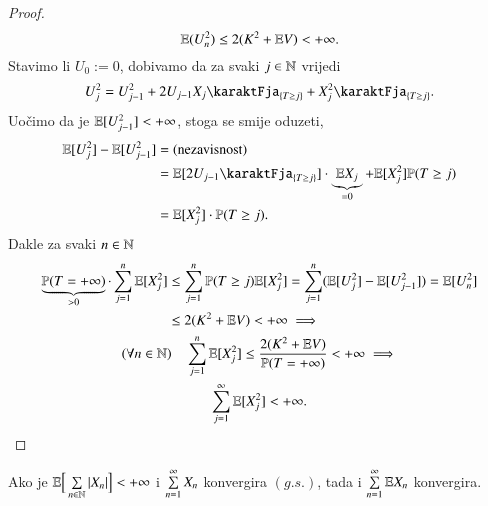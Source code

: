 \begin{proof}
\begin{equation*}
        \mathbb{E} (U_n^2) \leq 2 (K^2 + \mathbb{E} V) < +\infty.
    \end{equation*}
    Stavimo li $U_0 := 0$, dobivamo da za svaki $j \in \mathbb{N}$ vrijedi
    \begin{equation*}
        U_j^2 = U_{j - 1}^2 + 2 U_{j - 1} X_j \karaktFja_{\{ T \geq j \}} + X_j^2 \karaktFja_{\{ T \geq j \}}.
    \end{equation*}
    Uo\v cimo da je $\mathbb{E} [ U_{j - 1}^2 ] < + \infty$, stoga se smije oduzeti,
    \begin{equation*}
        \begin{aligned}
            \masE [U_j^2] - \masE [U_{j - 1}^2] &= (\textnormal{nezavisnost})\\
            &= \masE [2 U_{j - 1} \karaktFja_{\{ T \geq j \}}] \cdot \underbrace{\masE X_j}_{= 0} + \masE [X_j^2] \masP (T \geq j)\\
            &= \masE [X_j^2] \cdot \masP (T \geq j).
        \end{aligned}
    \end{equation*}
    Dakle za svaki $n \in \mathbb{N}$
    \begin{equation*}
        \begin{gathered}
            \begin{aligned}
                \underbrace{\mathbb{P} ( T = +\infty )}_{> 0} \cdot \sum\limits_{j = 1}^{n} \mathbb{E} [X_j^2] &\leq \sum\limits_{j = 1}^{n} \mathbb{P} (T \geq j) \mathbb{E} [X_j^2] = \sum\limits_{j = 1}^{n} (\mathbb{E} [U_j^2] - \mathbb{E} [U_{j - 1}^2]) = \mathbb{E} [U_n^2]\\
                &\leq 2(K^2 + \mathbb{E} V ) < +\infty \implies 
            \end{aligned}\\
            (\forall n \in \mathbb{N}) \quad \sum\limits_{j = 1}^{n} \mathbb{E} [X_j^2] \leq \frac{2 (K^2 + \mathbb{E} V)}{\mathbb{P} (T = +\infty)} < + \infty \implies\\
            \sum\limits_{j = 1}^{\infty} \mathbb{E} [X_j^2] < +\infty.
        \end{gathered}
    \end{equation*}
\end{proof}

\begin{prop}    \label{prop:13.14}
    Ako je $\mathbb{E} \Big[ \sum\limits_{n \in \mathbb{N}} |X_n| \Big] < +\infty$ i $\sum\limits_{n = 1}^{\infty} X_n$ konvergira $(g.s.)$, tada i $\sum\limits_{n = 1}^{\infty} \mathbb{E} X_n$ konvergira.
\end{prop}

